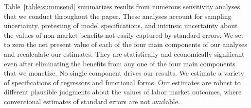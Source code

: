 Table~\ref{table:summsend} summarizes results from numerous sensitivity analyses that we conduct throughout the paper. These analyses account for sampling uncertainty, pretesting of model specifications, and intrinsic uncertainty about the values of non-market benefits not easily captured by standard errors. We set to zero the net present value of each of the four main components of our analyses and recalculate our estimates. They are statistically and economically significant even after eliminating the benefits from any one of the four main components that we monetize. No single component drives our results. We estimate a variety of specifications of regressors and functional forms. Our estimates are robust to different plausible judgments about the values of labor market outcomes, where conventional estimates of standard errors are not available.

